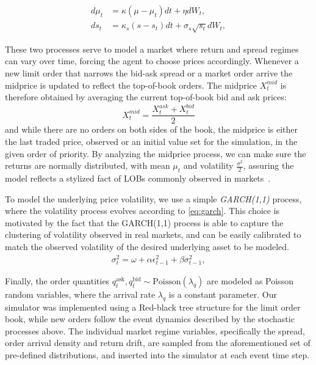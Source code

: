 \begin{equation*}
    \begin{aligned}
        d\mu_t &= \kappa (\mu - \mu_t) dt + \eta dW_t,\\
        ds_t &= \kappa_s (s - s_t ) dt + \sigma_s \sqrt{s_t} dW_t,
    \end{aligned}
    \label{eq:ou}
\end{equation*}

These two processes serve to model a market where return and spread regimes can vary over time, forcing the agent
to choose prices accordingly.
Whenever a new limit order that narrows the bid-ask spread or a market order arrive the midprice is updated to reflect the top-of-book orders.
The midprice $X_{t}^{mid}$ is therefore obtained by averaging the current top-of-book bid and ask prices:
\[
    X_{t}^{mid} = \frac{X_{t}^{ask} + X_{t}^{bid}}{2}
\]
and while there are no orders on both sides of the book, the midprice is either the last traded price,
observed or an initial value set for the simulation, in the given order of priority.
By analyzing the midprice process, we can make sure the returns are normally distributed, with mean $\mu_t$ and volatility $\frac{\sigma^2}{2}$,
assuring the model reflects a stylized fact of LOBs commonly observed in markets~\cite{Gueant2022}.

To model the underlying price volatility, we use a simple \textit{GARCH(1,1)} process, where the volatility process evolves according to \autoref{eq:garch}.
This choice is motivated by the fact that the GARCH(1,1) process is able to capture the clustering of volatility observed in real markets,
and can be easily calibrated to match the observed volatility of the desired underlying asset to be modeled.
\begin{equation}
    \begin{aligned}
        \sigma_t^2 = \omega + \alpha \epsilon_{t-1}^2 + \beta \sigma_{t-1}^2,
    \end{aligned}
    \label{eq:garch}
\end{equation}

Finally, the order quantities  $q_t^{\text{ask}}, q_t^{\text{bid}} \sim \text{Poisson}(\lambda_q)$
are modeled as Poisson random variables, where the arrival rate $\lambda_q$ is a constant parameter.
Our simulator was implemented using a Red-black tree structure for the limit order book,
while new orders follow the event dynamics described by the stochastic processes above.
The individual market regime variables, specifically the spread, order arrival density and return drift,
are sampled from the aforementioned set of pre-defined distributions, and inserted into the simulator at each event time step.